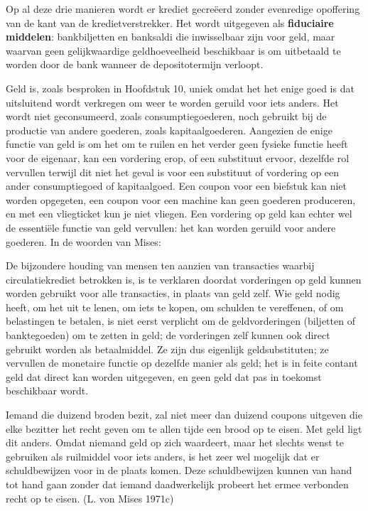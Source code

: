 \documentclass[
  a5paper,
  smalldemyvopaper,11pt,twoside,onecolumn,openright,extrafontsizes,
hidelinks]{memoir}
\begin{document}
Op al deze drie manieren wordt er krediet gecreëerd zonder evenredige
opoffering van de kant van de kredietverstrekker. Het wordt uitgegeven
als \textbf{fiduciaire middelen}: bankbiljetten en banksaldi die
inwisselbaar zijn voor geld, maar waarvan geen gelijkwaardige
geldhoeveelheid beschikbaar is om uitbetaald te worden door de bank
wanneer de depositotermijn verloopt.

Geld is, zoals besproken in Hoofdstuk 10, uniek omdat het het enige goed
is dat uitsluitend wordt verkregen om weer te worden geruild voor iets
anders. Het wordt niet geconsumeerd, zoals consumptiegoederen, noch
gebruikt bij de productie van andere goederen, zoals kapitaalgoederen.
Aangezien de enige functie van geld is om het om te ruilen en het verder
geen fysieke functie heeft voor de eigenaar, kan een vordering erop, of
een substituut ervoor, dezelfde rol vervullen terwijl dit niet het geval
is voor een substituut of vordering op een ander consumptiegoed of
kapitaalgoed. Een coupon voor een biefstuk kan niet worden opgegeten,
een coupon voor een machine kan geen goederen produceren, en met een
vliegticket kun je niet vliegen. Een vordering op geld kan echter wel de
essentiële functie van geld vervullen: het kan worden geruild voor
andere goederen. In de woorden van Mises:

De bijzondere houding van mensen ten aanzien van transacties waarbij
circulatiekrediet betrokken is, is te verklaren doordat vorderingen op
geld kunnen worden gebruikt voor alle transacties, in plaats van geld
zelf. Wie geld nodig heeft, om het uit te lenen, om iets te kopen, om
schulden te vereffenen, of om belastingen te betalen, is niet eerst
verplicht om de geldvorderingen (biljetten of banktegoeden) om te zetten
in geld; de vorderingen zelf kunnen ook direct gebruikt worden als
betaalmiddel. Ze zijn dus eigenlijk geldsubstituten; ze vervullen de
monetaire functie op dezelfde manier als geld; het is in feite contant
geld dat direct kan worden uitgegeven, en geen geld dat pas in toekomst
beschikbaar wordt.

Iemand die duizend broden bezit, zal niet meer dan duizend coupons
uitgeven die elke bezitter het recht geven om te allen tijde een brood
op te eisen. Met geld ligt dit anders. Omdat niemand geld op zich
waardeert, maar het slechts wenst te gebruiken als ruilmiddel voor iets
anders, is het zeer wel mogelijk dat er schuldbewijzen voor in de plaats
komen. Deze schuldbewijzen kunnen van hand tot hand gaan zonder dat
iemand daadwerkelijk probeert het ermee verbonden recht op te eisen. (L.
von Mises 1971c)
\end{document}
